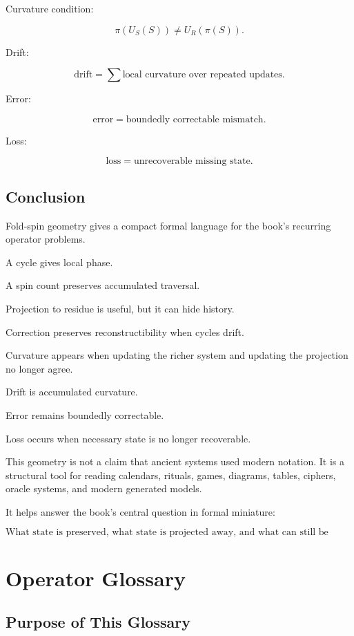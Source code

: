 \documentclass[11pt]{book}
\begin{document}
Curvature condition:

\[
\pi(U_S(S)) \neq U_R(\pi(S)).
\]

Drift:

\[
\text{drift} = \sum \text{local curvature over repeated updates}.
\]

Error:

\[
\text{error} = \text{boundedly correctable mismatch}.
\]

Loss:

\[
\text{loss} = \text{unrecoverable missing state}.
\]

\section{Conclusion}

Fold-spin geometry gives a compact formal language for the book's recurring operator problems.

A cycle gives local phase.

A spin count preserves accumulated traversal.

Projection to residue is useful, but it can hide history.

Correction preserves reconstructibility when cycles drift.

Curvature appears when updating the richer system and updating the projection no longer agree.

Drift is accumulated curvature.

Error remains boundedly correctable.

Loss occurs when necessary state is no longer recoverable.

This geometry is not a claim that ancient systems used modern notation. It is a structural tool for reading calendars, rituals, games, diagrams, tables, ciphers, oracle systems, and modern generated models.

It helps answer the book's central question in formal miniature:

\[
\text{What state is preserved, what state is projected away, and what can still be reconstructed?}
\]

\chapter{Operator Glossary}

\section{Purpose of This Glossary}
\end{document}
